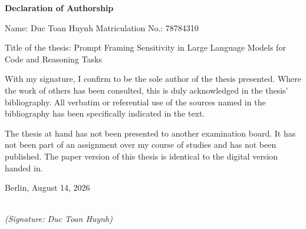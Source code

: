 \newpage

\thispagestyle{empty}

\begin{large}

\vspace*{3cm}

\large{ \textbf{Declaration of Authorship} }

\vspace{0.8cm}

\noindent
Name: Duc Toan Huynh \hfill Matriculation No.: 78784310

\vspace{0.3cm}
\noindent
Title of the thesis: Prompt Framing Sensitivity in Large Language Models for Code and Reasoning Tasks

\vspace{0.8cm}

\noindent
With my signature, I confirm to be the sole author of the thesis presented. Where the work of others has been consulted, this is duly acknowledged in the thesis' bibliography. All verbatim or referential use of the sources named in the bibliography has been specifically indicated in the text.

The thesis at hand has not been presented to another examination board. It has not been part of an assignment over my course of studies and has not been published. The paper version of this thesis is identical to the digital version handed in.
\vspace{1.5cm}

\noindent
Berlin, August 14, 2026

\vspace{2cm}

\hspace*{7cm}%
\dotfill\\
\hspace*{8.5cm}%
\textit{(Signature: Duc Toan Huynh)}

\end{large}

\newpage

\thispagestyle{empty}

